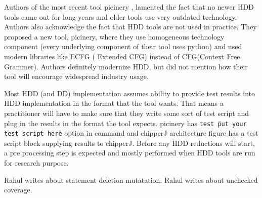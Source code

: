 Authors of the most recent tool picinery  \cite{pricieley}, lamented the fact that no newer HDD tools came out for long years and older tools use very outdated technology. Authors also acknowledge the fact that HDD tools are not used in practice. They proposed a new tool, picinery, where they use homogeneous technology component (every underlying component of their tool uses python) and used modern libraries like ECFG ( Extended CFG) instead of CFG(Context Free Grammer). Authors definitely modernize HDD, but did not mention how their tool will encourage widespread industry usage. 


Most HDD (and DD) implementation assumes ability to provide test results into HDD implementation in the format that the tool wants. That means a practitioner will have to make sure that they write some sort of test script and plug in the results in the format the tool expects. picinery has \texttt{test \"put your test script here\"} option in command and chipperJ architecture figure has a test script block supplying results to chipperJ.  Before any HDD reductions will start, a pre processing step is expected and mostly performed when HDD tools are run for research purpose. 

Rahul writes about statement deletion mutatation. 
Rahul writes about unchecked coverage.
 
%
 

    

   

